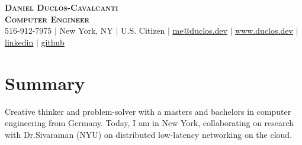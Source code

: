 \documentclass[letterpaper,11pt]{article}
\begin{document}
\begin{flushright}
\end{flushright}

\vspace{-5.0pt}

\begin{center}
    \textbf{\Huge \scshape Daniel Duclos-Cavalcanti} \\ \vspace{1pt}
    \textbf{\large{\scshape Computer Engineer}} \\ \vspace{1pt}
    \small 516-912-7975 $|$ New York, NY $|$ U.S. Citizen $|$
    \href{mailto:me@duclos.dev}{\underline{me@duclos.dev}} $|$ 
    \href{https://www.duclos.dev}{\underline{www.duclos.dev}} $|$
    \href{https://www.linkedin.com/in/duclos-cavalcanti/}{\underline{linkedin}} $|$
    \href{https://github.com/duclos-cavalcanti}{\underline{github}} 
\end{center}

\vspace{-8.0pt}

\section{Summary}
\small{
Creative thinker and problem-solver with a masters and bachelors in 
computer engineering from Germany. Today, I am in New York, 
collaborating on research with Dr.Sivaraman (NYU) on distributed 
low-latency networking on the cloud.
}

\vspace{-8.0pt}

\end{document}
